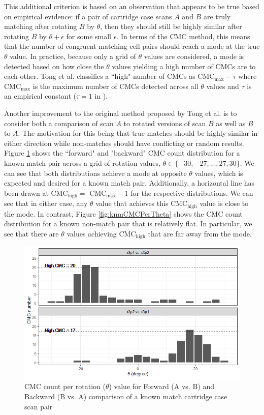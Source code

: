 This additional criterion is based on an observation that appears to be true based on empirical evidence: if a pair of cartridge case scans $A$ and $B$ are truly matching after rotating $B$ by $\theta$, then they should still be highly similar after rotating $B$ by $\theta + \epsilon$ for some small $\epsilon$. In terms of the CMC method, this means that the number of congruent matching cell pairs should reach a mode at the true $\theta$ value. In practice,  because only a grid of $\theta$ values are considered, a mode is detected based on how close the $\theta$ values yielding a high number of CMCs are to each other. Tong et al. classifies a ``high" number of CMCs as CMC$_{\max} - \tau$ where CMC$_{\max}$ is the maximum number of CMCs detected across all $\theta$ values and $\tau$ is an empirical constant ($\tau = 1$ in \citet{tong_improved_2015}). 

Another improvement to the original method proposed by Tong et al. is to consider both a comparison of scan $A$ to rotated versions of scan $B$ as well as $B$ to $A$. The motivation for this being that true matches should be highly similar in either direction while non-matches should have conflicting or random results. Figure \ref{fig:kmCMCPerTheta} shows the ``forward" and "backward" CMC count distribution for a known match pair across a grid of rotation values, $\theta \in \{-30,-27,...,27,30\}$. We can see that both distributions achieve a mode at opposite $\theta$ values, which is expected and desired for a known match pair. Additionally, a horizontal line has been drawn at CMC$_{\text{high}} =$ CMC$_{\max} - 1$ for the respective distributions. We can see that in either case, any $\theta$ value that achieves this CMC$_{\text{high}}$ value is close to the mode. In contrast, Figure \ref{fig:knmCMCPerTheta} shows the CMC count distribution for a known non-match pair that is relatively flat. In particular, we see that there are $\theta$ values achieving CMC$_{\text{high}}$ that are far away from the mode.
\begin{figure}[htbp]
  \centering
	\includegraphics[width = .7\textwidth]{images/kmCMCpertheta.png}
	\caption{CMC count per rotation ($\theta$) value for Forward (A vs. B) and Backward (B vs. A) comparison of a known match cartridge case scan pair}
 	\label{fig:kmCMCPerTheta}
\end{figure}

